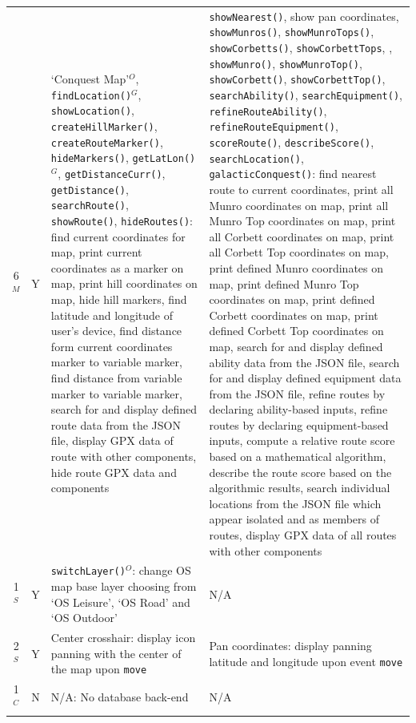 \documentclass[11pt, english]{article}
\begin{document}
\begin{center}
\begin{longtable}{ccp{5.5cm}p{5.5cm}}
		6$^M$ & Y & `Conquest Map'$^O$, \texttt{findLocation()}$^G$, \texttt{showLocation()}, \texttt{createHillMarker()}, \texttt{createRouteMarker()}, \texttt{hideMarkers()}, \texttt{getLatLon()}$^G$, \texttt{getDistanceCurr()}, \texttt{getDistance()}, \texttt{searchRoute()}, \texttt{showRoute()}, \texttt{hideRoutes()}: find current coordinates for map, print current coordinates as a marker on map, print hill coordinates on map, hide hill markers, find latitude and longitude of user's device, find distance form current coordinates marker to variable marker, find distance from variable marker to variable marker, search for and display defined route data from the JSON file, display GPX data of route with other components, hide route GPX data and components & \texttt{showNearest()}, show pan coordinates, \texttt{showMunros()}, \texttt{showMunroTops()}, \texttt{showCorbetts()}, \texttt{showCorbettTops}, , \texttt{showMunro()}, \texttt{showMunroTop()}, \texttt{showCorbett()}, \texttt{showCorbettTop()}, \texttt{searchAbility()}, \texttt{searchEquipment()}, \texttt{refineRouteAbility()}, \texttt{refineRouteEquipment()}, \texttt{scoreRoute()}, \texttt{describeScore()}, \texttt{searchLocation()}, \texttt{galacticConquest()}: find nearest route to current coordinates, print all Munro coordinates on map, print all Munro Top coordinates on map, print all Corbett coordinates on map, print all Corbett Top coordinates on map, print defined Munro coordinates on map, print defined Munro Top coordinates on map, print defined Corbett coordinates on map, print defined Corbett Top coordinates on map, search for and display defined ability data from the JSON file, search for and display defined equipment data from the JSON file, refine routes by declaring ability-based inputs, refine routes by declaring equipment-based inputs, compute a relative route score based on a mathematical algorithm, describe the route score based on the algorithmic results, search individual locations from the JSON file which appear isolated and as members of routes, display GPX data of all routes with other components\\
		1$^S$ & Y & \texttt{switchLayer()$^O$}: change OS map base layer choosing from `OS Leisure', `OS Road' and `OS Outdoor' & N/A\\
		2$^S$ & Y & Center crosshair: display icon panning with the center of the map upon \texttt{move} & Pan coordinates: display panning latitude and longitude upon event \texttt{move}\\
		1$^C$ & N & N/A: No database back-end & N/A\\

\end{longtable}
\end{center}
\end{document}
